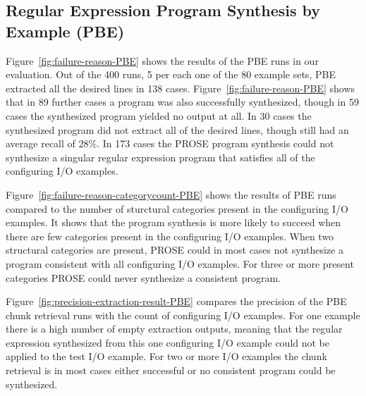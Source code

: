 \documentclass[\myrootdir/main.tex]{subfiles}
\begin{document}
\subsection{Regular Expression Program Synthesis by Example (PBE)}
Figure~\ref{fig:failure-reason-PBE} shows the results of the PBE runs in our evaluation.
Out of the 400 runs, 5 per each one of the 80 example sets, PBE extracted all the desired lines in 138 cases.
Figure~\ref{fig:failure-reason-PBE} shows that in 89 further cases a program was also successfully synthesized, though in 59 cases the synthesized program yielded no output at all.
In 30 cases the synthesized program did not extract all of the desired lines, though still had an average recall of 28\%.
In 173 cases the PROSE program synthesis could not synthesize a singular regular expression program that satisfies all of the configuring I/O examples.

Figure~\ref{fig:failure-reason-categorycount-PBE} shows the results of PBE runs compared to the number of sturctural categories present in the configuring I/O examples.
It shows that the program synthesis is more likely to succeed when there are few categories present in the configuring I/O examples.
When two structural categories are present, PROSE could in most cases not synthesize a program consistent with all configuring I/O examples.
For three or more present categories PROSE could never synthesize a consistent program.

Figure~\ref{fig:precision-extraction-result-PBE} compares the precision of the PBE chunk retrieval runs with the count of configuring I/O examples.
For one example there is a high number of empty extraction outputs, meaning that the regular expression synthesized from this one configuring I/O example could not be applied to the test I/O example.
For two or more I/O examples the chunk retrieval is in most cases either successful or no consistent program could be synthesized.
\end{document}
